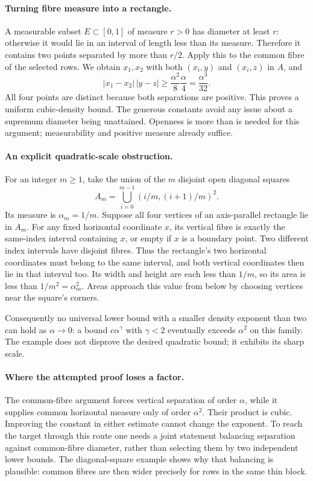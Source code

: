 \documentclass[11pt,a4paper]{article}
\begin{document}
\paragraph{Turning fibre measure into a rectangle.}
A measurable subset $E\subset[0,1]$ of measure $r>0$ has diameter at least $r$: otherwise it would lie in an interval of length less than its measure. Therefore it contains two points separated by more than $r/2$. Apply this to the common fibre of the selected rows. We obtain $x_1,x_2$ with both $(x_i,y)$ and $(x_i,z)$ in $A$, and
\[
 |x_1-x_2|\,|y-z|\geq\frac{\alpha^2}{8}\frac\alpha4
 =\frac{\alpha^3}{32}.
\]
All four points are distinct because both separations are positive. This proves a uniform cubic-density bound. The generous constants avoid any issue about a supremum diameter being unattained. Openness is more than is needed for this argument; measurability and positive measure already suffice.

\paragraph{An explicit quadratic-scale obstruction.}
For an integer $m\geq1$, take the union of the $m$ disjoint open diagonal squares
\[
 A_m=\bigcup_{i=0}^{m-1}(i/m,(i+1)/m)^2.
\]
Its measure is $\alpha_m=1/m$. Suppose all four vertices of an axis-parallel rectangle lie in $A_m$. For any fixed horizontal coordinate $x$, its vertical fibre is exactly the same-index interval containing $x$, or empty if $x$ is a boundary point. Two different index intervals have disjoint fibres. Thus the rectangle's two horizontal coordinates must belong to the same interval, and both vertical coordinates then lie in that interval too. Its width and height are each less than $1/m$, so its area is less than $1/m^2=\alpha_m^2$. Areas approach this value from below by choosing vertices near the square's corners.

Consequently no universal lower bound with a smaller density exponent than two can hold as $\alpha\to0$: a bound $c\alpha^\gamma$ with $\gamma<2$ eventually exceeds $\alpha^2$ on this family. The example does not disprove the desired quadratic bound; it exhibits its sharp scale.

\paragraph{Where the attempted proof loses a factor.}
The common-fibre argument forces vertical separation of order $\alpha$, while it supplies common horizontal measure only of order $\alpha^2$. Their product is cubic. Improving the constant in either estimate cannot change the exponent. To reach the target through this route one needs a joint statement balancing separation against common-fibre diameter, rather than selecting them by two independent lower bounds. The diagonal-square example shows why that balancing is plausible: common fibres are then wider precisely for rows in the same thin block.
\end{document}
